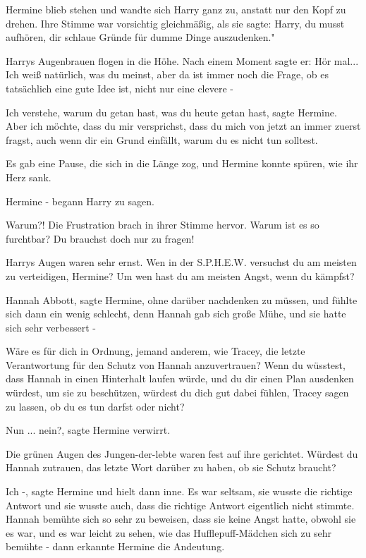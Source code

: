 Hermine blieb stehen und wandte sich Harry ganz zu, anstatt nur den Kopf zu
drehen. Ihre Stimme war vorsichtig gleichmäßig, als sie sagte: \glqq{}Harry, du
musst aufhören, dir schlaue Gründe für dumme Dinge auszudenken."

Harrys Augenbrauen flogen in die Höhe. Nach einem Moment sagte er: \glqq{}Hör
mal... Ich weiß natürlich, was du meinst, aber da ist immer noch die Frage, ob
es tatsächlich eine gute Idee ist, nicht nur eine clevere -\grqq{}

\glqq{}Ich verstehe, warum du getan hast, was du heute getan hast\grqq{}, sagte
Hermine. \glqq{}Aber ich möchte, dass du mir versprichst, dass du mich von jetzt
an immer zuerst fragst, auch wenn dir ein Grund einfällt, warum du es nicht tun
solltest.\grqq{}

Es gab eine Pause, die sich in die Länge zog, und Hermine konnte spüren, wie ihr
Herz sank.

\glqq{}Hermine -\grqq{} begann Harry zu sagen.

\glqq{}Warum?!\grqq{} Die Frustration brach in ihrer Stimme hervor. \glqq{}Warum
ist es so furchtbar? Du brauchst doch nur zu fragen!\grqq{}

Harrys Augen waren sehr ernst. \glqq{}Wen in der S.P.H.E.W. versuchst du am
meisten zu verteidigen, Hermine? Um wen hast du am meisten Angst, wenn du
kämpfst?\grqq{}

\glqq{}Hannah Abbott\grqq{}, sagte Hermine, ohne darüber nachdenken zu müssen,
und fühlte sich dann ein wenig schlecht, denn Hannah gab sich große Mühe, und
sie hatte sich sehr verbessert -

\glqq{}Wäre es für dich in Ordnung, jemand anderem, wie Tracey, die letzte
Verantwortung für den Schutz von Hannah anzuvertrauen? Wenn du wüsstest, dass
Hannah in einen Hinterhalt laufen würde, und du dir einen Plan ausdenken
würdest, um sie zu beschützen, würdest du dich gut dabei fühlen, Tracey sagen zu
lassen, ob du es tun darfst oder nicht?\grqq{}

\glqq{}Nun ... nein?\grqq{}, sagte Hermine verwirrt.

Die grünen Augen des Jungen-der-lebte waren fest auf ihre gerichtet. \glqq
Würdest du Hannah zutrauen, das letzte Wort darüber zu haben, ob sie Schutz
braucht?\grqq{}

\glqq{}Ich -\grqq{}, sagte Hermine und hielt dann inne. Es war seltsam, sie
wusste die richtige Antwort und sie wusste auch, dass die richtige Antwort
eigentlich nicht stimmte. Hannah bemühte sich so sehr zu beweisen, dass sie
keine Angst hatte, obwohl sie es war, und es war leicht zu sehen, wie das
Hufflepuff-Mädchen sich zu sehr bemühte - dann erkannte Hermine die Andeutung.

